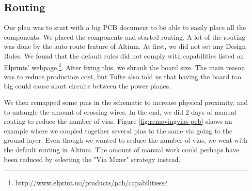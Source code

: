 \subsection {Routing}

Our plan was to start with a big PCB document to be able to easily place all the components. We placed the components and started routing. A lot of the routing was done by the auto route feature of Altium. At first, we did not set any Design Rules. We found that the default rules did not comply with capabilities listed on Elprints' webpage.\footnote {\url{http://www.elprint.no/products/pcb/capabilities}}. After fixing this, we shrank the board size. The main reason was to reduce production cost, but Tufte also told us that having the board too big could cause short circuits between the power planes.

We then remapped some pins in the schematic to increase physical proximity, and to untangle the amount of crossing wires. In the end, we did 2 days of manual routing to reduce the number of vias. Figure \ref{fig:removingvias-pcb} shows an example where we coupled together several pins to the same via going to the ground layer. Even though we wanted to reduce the number of vias, we went with the default routing in Altium. The amount of manual work could perhaps have been reduced by selecting the "Via Mixer" strategy instead. 


